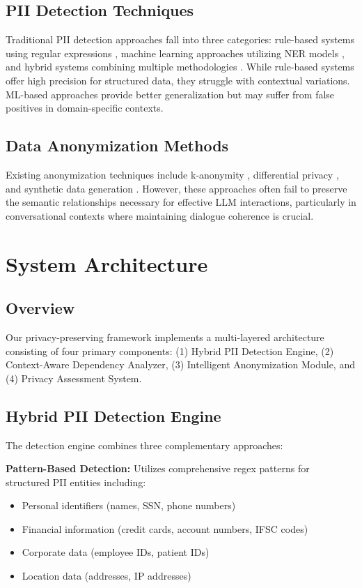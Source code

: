 \documentclass[conference]{IEEEtran}
\begin{document}
\subsection{PII Detection Techniques}

Traditional PII detection approaches fall into three categories: rule-based systems using regular expressions \cite{ref4}, machine learning approaches utilizing NER models \cite{ref5}, and hybrid systems combining multiple methodologies \cite{ref6}. While rule-based systems offer high precision for structured data, they struggle with contextual variations. ML-based approaches provide better generalization but may suffer from false positives in domain-specific contexts.

\subsection{Data Anonymization Methods}

Existing anonymization techniques include k-anonymity \cite{ref7}, differential privacy \cite{ref8}, and synthetic data generation \cite{ref9}. However, these approaches often fail to preserve the semantic relationships necessary for effective LLM interactions, particularly in conversational contexts where maintaining dialogue coherence is crucial.

\section{System Architecture}

\subsection{Overview}

Our privacy-preserving framework implements a multi-layered architecture consisting of four primary components: (1) Hybrid PII Detection Engine, (2) Context-Aware Dependency Analyzer, (3) Intelligent Anonymization Module, and (4) Privacy Assessment System.

\subsection{Hybrid PII Detection Engine}

The detection engine combines three complementary approaches:

\textbf{Pattern-Based Detection:} Utilizes comprehensive regex patterns for structured PII entities including:
\begin{itemize}
\item Personal identifiers (names, SSN, phone numbers)
\item Financial information (credit cards, account numbers, IFSC codes)
\item Corporate data (employee IDs, patient IDs)
\item Location data (addresses, IP addresses)
\end{itemize}
\end{document}
